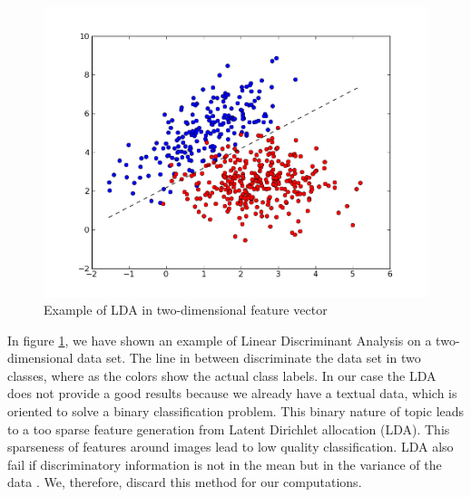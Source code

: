  \begin{center}
\begin{figure}
\centering
\includegraphics[width=\linewidth]{./Pictures/lda_binary.jpg}
\caption{Example of LDA in two-dimensional feature vector \cite{Blei}}
\label{fig:ldaExample}
\end{figure}
\end{center}
	In figure \ref{fig:ldaExample}, we have shown an example of Linear Discriminant Analysis on a two-dimensional data set. The line in between discriminate the data set in two classes, where as the colors show the actual class labels.
	In our case the LDA does not provide a good results because we already have a textual data, which is oriented to solve a binary classification problem. This binary nature of topic leads to a too sparse feature generation from Latent Dirichlet allocation (LDA). This sparseness of features around images lead to low quality classification. LDA also fail if discriminatory information is
not in the mean but in the variance of the data  \cite{Blei}. We, therefore, discard this method for our computations.

